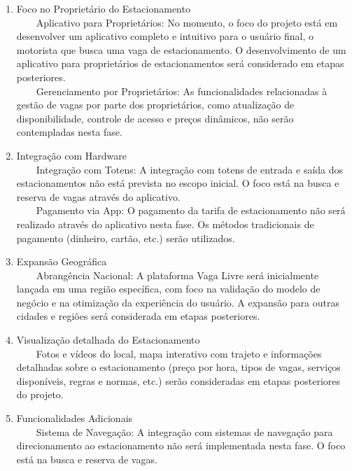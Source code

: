 \documentclass[a4paper,12pt]{article}
\newcommand{\tabitem}{~~\llap{\textbullet}~~}
\begin{document}
\begin{enumerate}
\setlength\itemsep{-1.2em}
\item Foco no Proprietário do Estacionamento \\ 
    \tabitem{Aplicativo para Proprietários: No momento, o foco do projeto está em desenvolver um aplicativo completo e intuitivo para o usuário final, o motorista que busca uma vaga de estacionamento. O desenvolvimento de um aplicativo para proprietários de estacionamentos será considerado em etapas posteriores.} \\
    \tabitem{Gerenciamento por Proprietários: As funcionalidades relacionadas à gestão de vagas por parte dos proprietários, como atualização de disponibilidade, controle de acesso e preços dinâmicos, não serão contempladas nesta fase.} \\

\item Integração com Hardware \\
    \tabitem{Integração com Totens: A integração com totens de entrada e saída dos estacionamentos não está prevista no escopo inicial. O foco está na busca e reserva de vagas através do aplicativo.} \\
    \tabitem{Pagamento via App: O pagamento da tarifa de estacionamento não será realizado através do aplicativo nesta fase. Os métodos tradicionais de pagamento (dinheiro, cartão, etc.) serão utilizados.}\\

\item Expansão Geográfica \\
    \tabitem{Abrangência Nacional: A plataforma Vaga Livre será inicialmente lançada em uma região específica, com foco na validação do modelo de negócio e na otimização da experiência do usuário. A expansão para outras cidades e regiões será considerada em etapas posteriores.} \\

\item Visualização detalhada do Estacionamento \\
    \tabitem{Fotos e vídeos do local, mapa interativo com trajeto e informações detalhadas sobre o estacionamento (preço por hora, tipos de vagas, serviços disponíveis, regras e normas, etc.) serão consideradas em etapas posteriores do projeto.} \\

\item Funcionalidades Adicionais \\
    \tabitem{Sistema de Navegação: A integração com sistemas de navegação para direcionamento ao estacionamento não será implementada nesta fase. O foco está na busca e reserva de vagas.} \\

\end{enumerate}
\end{document}
